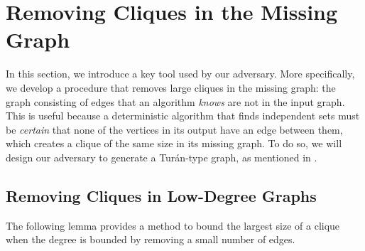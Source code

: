 \documentclass[11pt]{article}
\theoremstyle{definition}
\begin{document}
\section{Removing Cliques in the Missing Graph}

\indent In this section, we introduce a key tool used by our adversary. More specifically, we develop a procedure that removes large cliques in the missing graph: the graph consisting of edges that an algorithm \textit{knows} are not in the input graph. This is useful because a deterministic algorithm that finds independent sets must be \textit{certain} that none of the vertices in its output have an edge between them, which creates a clique of the same size in its missing graph. To do so, we will design our adversary to generate a Tur\'an-type graph, as mentioned in .

\subsection{Removing Cliques in Low-Degree Graphs}
The following lemma provides a method to bound the largest size of a clique when the degree is bounded by removing a small number of edges.
\end{document}
